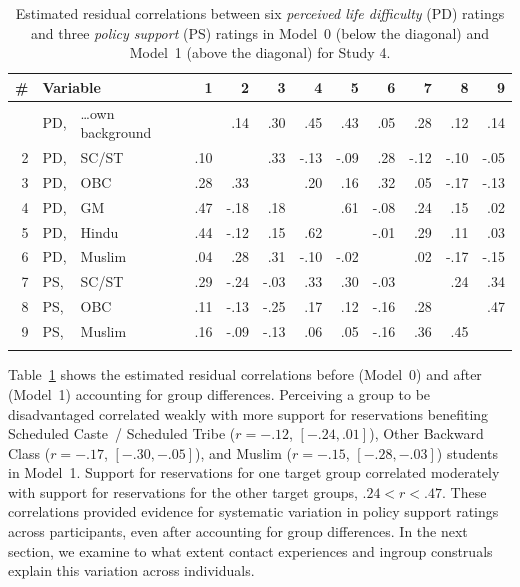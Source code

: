\documentclass[12pt, a4paper]{article}
\begin{document}
\begin{table}
\centering
{}
\caption[Estimated residual correlations in Models 0 and 1 for Study 4]{Estimated residual correlations between six \emph{perceived life difficulty} (PD) ratings and three \emph{policy support} (PS) ratings in Model~0 (below the diagonal) and Model~1 (above the diagonal) for Study 4.}
\small	
\begin{tabularx}{\linewidth}{rl@{~}Xrrrrrr|rrr} \toprule
\# & \multicolumn{2}{l}{Variable} & 1 & 2 & 3 & 4 & 5 & 6 & 7 & 8 & 9 \\ \midrule \addlinespace
1 & PD, & \ldots own background & \textbf{}  & .14 & .30 & .45 & .43 & .05 & .28 & .12 & .14 \\
2 & PD, & SC/ST  & .10 & \textbf{} & .33 & -.13 & -.09 & .28 & -.12 & -.10 & -.05 \\
3 & PD, & OBC    & .28 & .33 & \textbf{} & .20 & .16 & .32 & .05 & -.17 & -.13  \\
4 & PD, & GM     & .47 & -.18 & .18 & \textbf{} & .61 & -.08 & .24 & .15 & .02 \\
5 & PD, & Hindu  & .44 & -.12 & .15 & .62 & \textbf{} & -.01 & .29 & .11 & .03  \\
6 & PD, & Muslim & .04 & .28 & .31 & -.10 & -.02 & \textbf{} & .02 & -.17 & -.15 \\ \midrule
7 & PS, & SC/ST  & .29 & -.24 & -.03 & .33 & .30 & -.03 & \textbf{} & .24 & .34 \\
8 & PS, & OBC    & .11 & -.13 & -.25 & .17 & .12 & -.16 & .28 & \textbf{} & .47 \\
9 & PS, & Muslim & .16 & -.09 & -.13 & .06 & .05 & -.16 & .36 & .45 & \textbf{}   \\ \addlinespace \bottomrule
\end{tabularx}
\label{tab:ch5-s4-1}
\end{table}

Table~\ref{tab:ch5-s4-1} shows the estimated residual correlations before (Model~0) and after (Model~1) accounting for group differences. Perceiving a group to be disadvantaged correlated weakly with more support for reservations benefiting Scheduled Caste~/ Scheduled Tribe ($r = -.12 $, $[-.24,.01]$), Other Backward Class ($r = -.17$, $[-.30,-.05]$), and Muslim ($r = -.15$, $[-.28,-.03]$) students in Model~1. Support for reservations for one target group correlated moderately with support for reservations for the other target groups, $.24 < r < .47$. These correlations provided evidence for systematic variation in policy support ratings across participants, even after accounting for group differences. In the next section, we examine to what extent contact experiences and ingroup construals explain this variation across individuals.
\end{document}
